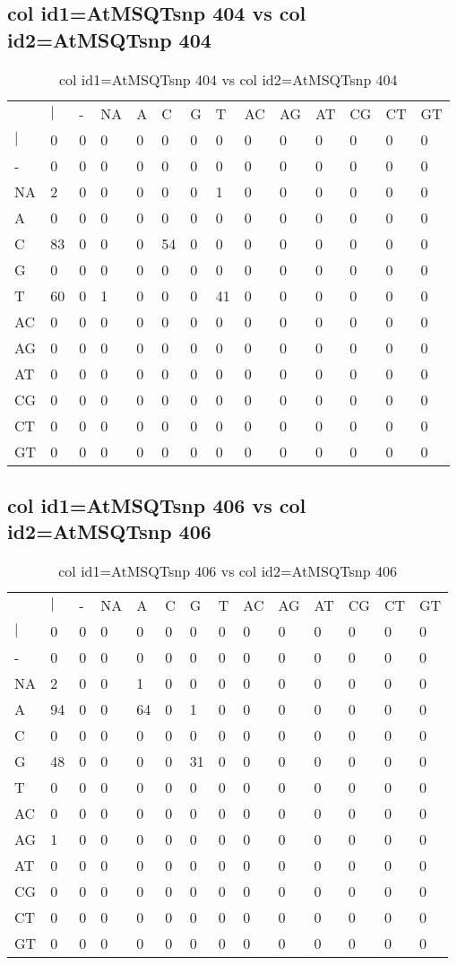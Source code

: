 \subsection{col id1=AtMSQTsnp 404 vs col id2=AtMSQTsnp 404}
\begin{center}
\begin{longtable}{|l|l|l|l|l|l|l|l|l|l|l|l|l|l|}
\caption{col id1=AtMSQTsnp 404 vs col id2=AtMSQTsnp 404} \label{table_dm718}\\
\hline
\\
\hline
&$|$&-&NA&A&C&G&T&AC&AG&AT&CG&CT&GT\\
$|$&0&0&0&0&0&0&0&0&0&0&0&0&0\\
-&0&0&0&0&0&0&0&0&0&0&0&0&0\\
NA&2&0&0&0&0&0&1&0&0&0&0&0&0\\
A&0&0&0&0&0&0&0&0&0&0&0&0&0\\
C&83&0&0&0&54&0&0&0&0&0&0&0&0\\
G&0&0&0&0&0&0&0&0&0&0&0&0&0\\
T&60&0&1&0&0&0&41&0&0&0&0&0&0\\
AC&0&0&0&0&0&0&0&0&0&0&0&0&0\\
AG&0&0&0&0&0&0&0&0&0&0&0&0&0\\
AT&0&0&0&0&0&0&0&0&0&0&0&0&0\\
CG&0&0&0&0&0&0&0&0&0&0&0&0&0\\
CT&0&0&0&0&0&0&0&0&0&0&0&0&0\\
GT&0&0&0&0&0&0&0&0&0&0&0&0&0\\
\hline
\end{longtable}
\end{center}

\subsection{col id1=AtMSQTsnp 406 vs col id2=AtMSQTsnp 406}
\begin{center}
\begin{longtable}{|l|l|l|l|l|l|l|l|l|l|l|l|l|l|}
\caption{col id1=AtMSQTsnp 406 vs col id2=AtMSQTsnp 406} \label{table_dm720}\\
\hline
\\
\hline
&$|$&-&NA&A&C&G&T&AC&AG&AT&CG&CT&GT\\
$|$&0&0&0&0&0&0&0&0&0&0&0&0&0\\
-&0&0&0&0&0&0&0&0&0&0&0&0&0\\
NA&2&0&0&1&0&0&0&0&0&0&0&0&0\\
A&94&0&0&64&0&1&0&0&0&0&0&0&0\\
C&0&0&0&0&0&0&0&0&0&0&0&0&0\\
G&48&0&0&0&0&31&0&0&0&0&0&0&0\\
T&0&0&0&0&0&0&0&0&0&0&0&0&0\\
AC&0&0&0&0&0&0&0&0&0&0&0&0&0\\
AG&1&0&0&0&0&0&0&0&0&0&0&0&0\\
AT&0&0&0&0&0&0&0&0&0&0&0&0&0\\
CG&0&0&0&0&0&0&0&0&0&0&0&0&0\\
CT&0&0&0&0&0&0&0&0&0&0&0&0&0\\
GT&0&0&0&0&0&0&0&0&0&0&0&0&0\\
\hline
\end{longtable}
\end{center}

